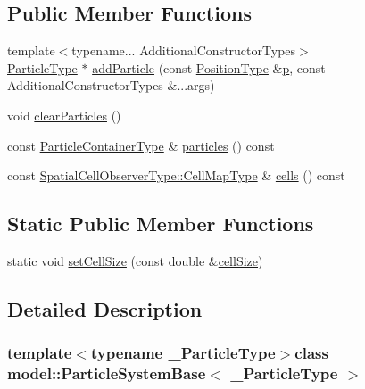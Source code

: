 \subsection*{Public Member Functions}
\begin{DoxyCompactItemize}
\item 
{\footnotesize template$<$typename... Additional\+Constructor\+Types$>$ }\\\hyperlink{classmodel_1_1_particle_system_base_a3a4f5423639021d769ab7d4cfbf246c3}{Particle\+Type} $\ast$ \hyperlink{classmodel_1_1_particle_system_base_af46a59ca7fae7d8e7f291e3a6c6bb436}{add\+Particle} (const \hyperlink{classmodel_1_1_particle_system_base_ab0a407d587b9779443f0b45e55185002}{Position\+Type} \&\hyperlink{plot_cells_8m_ac483f6ce851c9ecd9fb835ff7551737c}{p}, const Additional\+Constructor\+Types \&...args)
\item 
void \hyperlink{classmodel_1_1_particle_system_base_a542155248eda1268b0eb487e7f3c39f6}{clear\+Particles} ()
\item 
const \hyperlink{classmodel_1_1_particle_system_base_ac95d9a819d1da5e86f726494bf6df504}{Particle\+Container\+Type} \& \hyperlink{classmodel_1_1_particle_system_base_a37f702be0e0a3035778a8b1e9e1fe3a4}{particles} () const 
\item 
const \hyperlink{structmodel_1_1_spatial_cell_observer_a3ee3ac7a68725cbe49ef4ae951ce2231}{Spatial\+Cell\+Observer\+Type\+::\+Cell\+Map\+Type} \& \hyperlink{classmodel_1_1_particle_system_base_adeac4c692b9562b792be33504615d951}{cells} () const 
\end{DoxyCompactItemize}
\subsection*{Static Public Member Functions}
\begin{DoxyCompactItemize}
\item 
static void \hyperlink{classmodel_1_1_particle_system_base_a4a7447ccc90f9da6e7078b136dcf1594}{set\+Cell\+Size} (const double \&\hyperlink{plot_cells_8m_ac441c3def9bdd7bd200e3f7f9d080395}{cell\+Size})
\end{DoxyCompactItemize}


\subsection{Detailed Description}
\subsubsection*{template$<$typename \+\_\+\+Particle\+Type$>$class model\+::\+Particle\+System\+Base$<$ \+\_\+\+Particle\+Type $>$}




